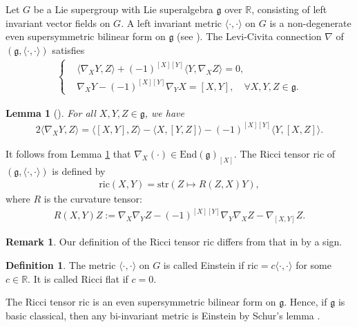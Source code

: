 \documentclass[reqno]{amsart}
\newtheorem{lem}[thm]{Lemma}
\theoremstyle{definition}
\newtheorem{defn}[thm]{Definition}
\newtheorem{rem}[thm]{Remark}
\begin{document}
Let $G$ be a Lie supergroup with Lie superalgebra $\mathfrak{g}$ over $\mathbb{R}$, consisting of left invariant vector fields on $G$.
A left invariant metric $\langle\cdot,\cdot\rangle$ on $G$ is a non-degenerate even supersymmetric bilinear form on $\mathfrak{g}$ (see \cite[Theorem 3]{Goer08}). The Levi-Civita connection $\nabla$ of $(\mathfrak{g},\langle\cdot,\cdot\rangle)$ satisfies
\begin{eqnarray*}
\left\{
\begin{aligned}
&\langle\nabla_{X}Y,Z\rangle+(-1)^{[X][Y]}\langle Y,\nabla_{X}Z\rangle=0,\\
&\nabla_{X}Y-(-1)^{[X][Y]}\nabla_{Y}X=[X,Y],\quad \forall X,Y,Z\in\mathfrak{g}.
\end{aligned}\right.
\end{eqnarray*}
\begin{lem}[\cite{Goer08,ZGPR24}]\label{3-lem-civita}
For all $ X,Y,Z\in\mathfrak{g}$, we have
\begin{eqnarray}\label{Eq1}
2\langle\nabla_{X}Y,Z\rangle=\langle[X,Y],Z\rangle-\langle X,[Y,Z]\rangle-(-1)^{[X][Y]}\langle Y,[X,Z]\rangle.
\end{eqnarray}
\end{lem}

It follows from Lemma \ref{3-lem-civita} that $\nabla_{X}(\cdot) \in \mathrm{End}(\mathfrak{g})_{[X]}$.
 The Ricci tensor $\mathrm{ric}$ of $(\mathfrak{g},\langle\cdot,\cdot\rangle)$ is defined by
\begin{eqnarray*}
\mathrm{ric}(X,Y)=\mathrm{str}(Z\mapsto R(Z,X)Y),
\end{eqnarray*}
where $R$ is the curvature tensor:
\begin{eqnarray*}
R(X,Y)Z:=\nabla_{X}\nabla_{Y}Z-(-1)^{[X][Y]}\nabla_{Y}\nabla_{X}Z-\nabla_{[X,Y]}Z.
\end{eqnarray*}
\begin{rem}
Our definition of the Ricci tensor $\mathrm{ric}$ differs from that in \cite[formula (3.6)]{ZGPR24} by a sign.
\end{rem}
\begin{defn}
The metric $\langle\cdot,\cdot\rangle$ on $G$ is called Einstein if $\mathrm{ric}=c\langle\cdot,\cdot\rangle$ for some $c\in\mathbb{R}$. It is called Ricci flat if  $c=0$.
\end{defn}

The Ricci tensor $\mathrm{ric}$ is an even supersymmetric bilinear form on $\mathfrak{g}$. Hence, if $\mathfrak{g}$ is basic classical, then any bi-invariant metric is Einstein by Schur's lemma \cite{Kac}.
\end{document}
